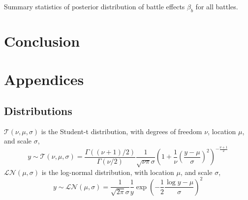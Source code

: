 \documentclass[11pt, oneside, article]{memoir}
\newcommand{\dist}[1]{\mathcal{#1}}
\newcommand{\paren}[1]{\mathopen{}\left(#1\right)\mathclose{}}
\newcommand{\disti}[2]{\ensuremath{\dist{#1}\paren{#2}}}
\newcommand{\dlnorm}[1]{\disti{LN}{#1}}
\newcommand{\dt}[1]{\disti{T}{#1}}
\begin{document}
\begin{table}
  \caption{Summary statistics of posterior distribution of battle effects $\beta_b$ for all battles.}
  \label{tab:battle_effects}
\end{table}

\section{Conclusion}
\label{sec:conclusion}



\newpage

\section{Appendices}
\label{sec:appendix}

\subsection{Distributions}

$\dt{\nu, \mu, \sigma}$ is the Student-t distribution, with degrees of freedom $\nu$, location $\mu$, and scale $\sigma$,
\begin{equation}
  \label{eq:8}
  y \sim \dt{\nu, \mu, \sigma} = \frac{\Gamma((\nu + 1) / 2)}{\Gamma(\nu / 2)} \frac{1}{\sqrt{\nu \pi} \sigma} 
  \left(
    1 + \frac{1}{\nu}
    \left(
      \frac{y - \mu}{\sigma}
    \right)^{2}
  \right)^{-\frac{\nu + 1}{2}}
\end{equation}
$\dlnorm{\mu, \sigma}$ is the log-normal distribution, with location $\mu$, and scale $\sigma$,
\begin{equation}
  \label{eq:7}
  y \sim \dlnorm{\mu, \sigma} = \frac{1}{\sqrt{2 \pi} \sigma} \frac{1}{y} \exp
  \left(
    - \frac{1}{2} \frac{\log y - \mu}{\sigma}
  \right)^{2}
\end{equation}

\printbibliography{}
\end{document}
